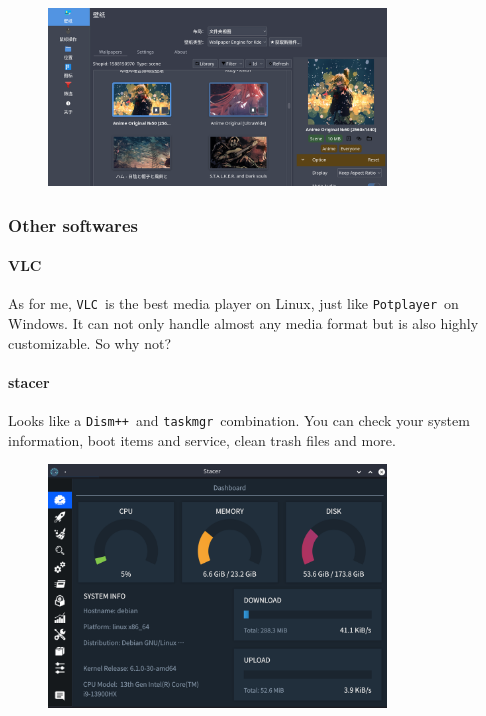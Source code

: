 \documentclass[12pt]{ctexart}
\begin{document}
\begin{figure}[H]
    \centering
    \includegraphics[width=0.8\textwidth,keepaspectratio]{assets/Linux/3.2 Decorate your own garden/11.png}
\end{figure}

\subsubsection{\textbf{Other softwares}}

\paragraph{\textbf{VLC}}

As for me, \texttt{VLC}\ is the best media player on Linux, just like
\texttt{Potplayer}\ on Windows. It can not only handle almost any media
format but is also highly customizable. So why not?

\paragraph{\textbf{stacer}}

Looks like a \texttt{Dism++}\ and \texttt{taskmgr}\ combination. You can
check your system information, boot items and service, clean trash files
and more.

\begin{figure}[H]
    \centering
    \includegraphics[width=0.8\textwidth,keepaspectratio]{assets/Linux/3.2 Decorate your own garden/12.png}
\end{figure}
\end{document}
